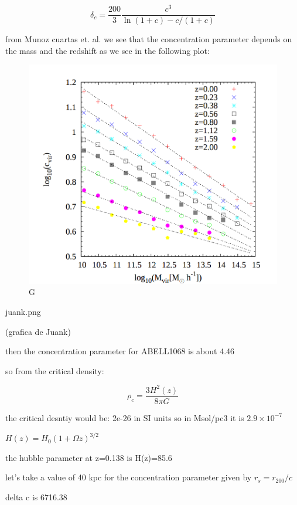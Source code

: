 \begin{equation}
\delta_{c}=\frac{200}{3}\frac{c^{3}}{\ln{(1+c)}-c/(1+c)}
\end{equation}

from Munoz cuartas et. al. we see that the concentration parameter depends on the mass and the redshift as we see in the following plot:

\begin{figure}[H]
\centering
\includegraphics[width=12cm]{images/juank.png}
\caption[M]{G}
\end{figure}
juank.png

(grafica de Juank)

then the concentration parameter for ABELL1068 is about 4.46 

so from the critical density:

\begin{equation}
\rho_{c}=\frac{3H^2(z)}{8\pi G}
\end{equation}

the critical desntiy would be: 2e-26 in SI units so in Msol/pc3 it is $2.9\times 10^{-7}$

$H(z)=H_{0}(1+\Omega z)^{3/2}$

the hubble parameter at z=0.138 is H(z)=85.6

let's take a value of 40 kpc for the concentration parameter given by $r_{s}=r_{200}/c$

delta c is 6716.38



\newpage
